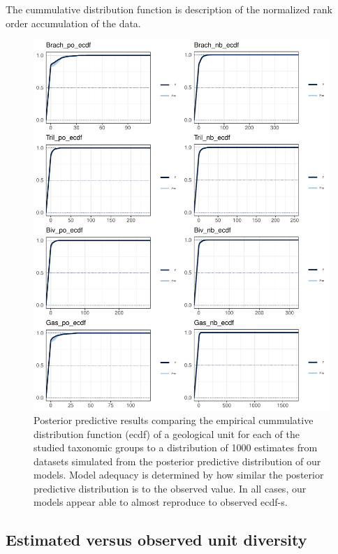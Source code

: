 \documentclass[12pt,letterpaper]{article}
\begin{document}
The cummulative distribution function is description of the normalized rank order accumulation of the data.

\begin{figure}[ht]
  \centering
  \includegraphics[width=\textwidth,height=0.5\textheight,keepaspectratio=true]{figure/ppc_ecdf}
  \caption{Posterior predictive results comparing the empirical cummulative distribution function (ecdf) of a geological unit for each of the studied taxonomic groups to a distribution of 1000 estimates from datasets simulated from the posterior predictive distribution of our models. Model adequacy is determined by how similar the posterior predictive distribution is to the observed value. In all cases, our models appear able to almost reproduce to observed ecdf-s.}
  \label{fig:ppc_ecdf}
\end{figure}






\subsection{Estimated versus observed unit diversity}
\end{document}
